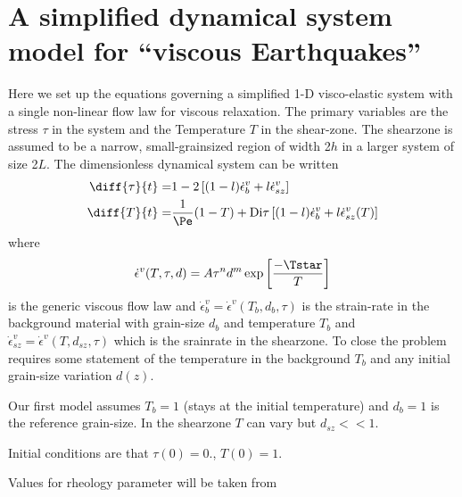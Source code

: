 \documentclass[12pt]{article}
\newcommand{\edotv}{\dot{\epsilon}^{v}}
\newcommand{\edotb}{\edotv_{b}}
\newcommand{\edotsz}{\edotv_{sz}}
\newcommand{\Di}{\mathrm{Di}}
\begin{document}
\section{A simplified dynamical system model for ``viscous Earthquakes''}
\label{sec:simpl-dynam-syst}

Here we set up the equations governing a simplified 1-D visco-elastic system with a single non-linear flow law for viscous relaxation.  The primary variables are the stress $\tau$ in the system and the Temperature $T$ in the shear-zone.  The shearzone is assumed to be a narrow, small-grainsized region of width 2$h$ in a larger system of size 2$L$.  The dimensionless dynamical system can be written
\begin{align}
  \label{eq:1}
  \diff{\tau}{t} =& 1  - 2
                  \left[
                  (1-l)\edotb + l\edotsz
                  \right]\\
 \diff{T}{t} =& \frac{1}{\Pe}(1-T) + \Di\tau
                 \left[
                 (1-l)\edotb + l\edotsz(T)
                 \right]\\
\end{align}
where
\begin{displaymath}
  \edotv(T,\tau,d) = A\tau^{n} d^{m}\exp
  \left[
    \frac{-\Tstar}{T}
  \right]
\end{displaymath}
is the generic viscous flow law and $\edotb=\edotv(T_{b},d_{b},\tau)$ is the strain-rate in the background material with grain-size $d_{b}$ and temperature $T_{b}$ and $\edotsz=\edotv(T,d_{sz},\tau)$ which is the srainrate in the shearzone.  To close the problem requires some statement of the temperature in the background $T_{b}$ and any initial grain-size variation $d(z)$.

Our first model assumes $T_{b}=1$ (stays at the initial temperature) and $d_{b}=1$ is the reference grain-size.
In the shearzone $T$ can vary but $d_{sz}<<1$.

Initial conditions are that $\tau(0)=0.$, $T(0)=1.$

Values for rheology parameter will be taken from \cite{kelemen_periodic_2007}


\end{document}

